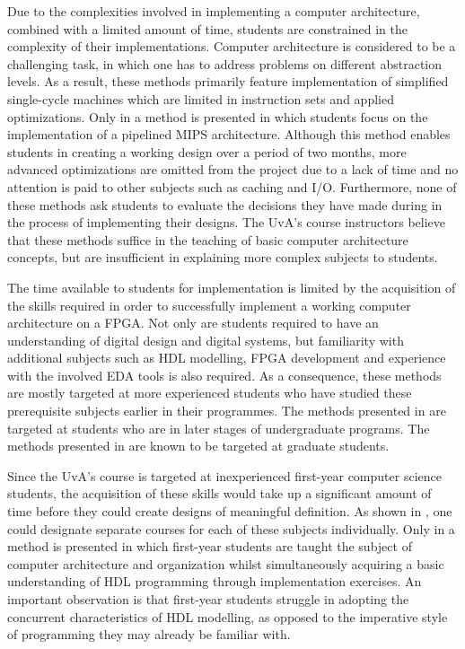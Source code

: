 \documentclass[openright]{template/uva-bachelor-thesis}
\begin{document}
Due to the complexities involved in implementing a computer architecture, combined with a limited amount of time, students are constrained in the complexity of their implementations. Computer architecture is considered to be a challenging task, in which one has to address problems on different abstraction levels. As a result, these methods primarily feature implementation of simplified single-cycle machines which are limited in instruction sets and applied optimizations. Only in \cite{lee2012pipelined} a method is presented in which students focus on the implementation of a pipelined MIPS architecture. Although this method enables students in creating a working design over a period of two months, more advanced optimizations are omitted from the project due to a lack of time and no attention is paid to other subjects such as caching and I/O. Furthermore, none of these methods ask students to evaluate the decisions they have made during in the process of implementing their designs.  The UvA's course instructors believe that these methods suffice in the teaching of basic computer architecture concepts, but are insufficient in explaining more complex subjects to students.


The time available to students for implementation is limited by the acquisition of the skills required in order to successfully implement a working computer architecture on a FPGA. Not only are students required to have an understanding of digital design and digital systems, but familiarity with additional subjects such as HDL modelling, FPGA development and experience with the involved EDA tools is also required. As a consequence, these methods are mostly targeted at more experienced students who have studied these prerequisite subjects earlier in their programmes. The methods presented in \cite{lee2012pipelined, kellett2012project} are targeted at students who are in later stages of undergraduate programs. The methods presented in \cite{nakano2008processor, jansen2014every, pereira2012basic} are known to be targeted at graduate students. 

Since the UvA's course is targeted at inexperienced first-year computer science students, the acquisition of these skills would take up a significant amount of time before they could create designs of meaningful definition. As shown in \cite[Fig. 1]{jansen2014every}, one could designate separate courses for each of these subjects individually. Only in \cite{cifredo2015computer} a method is presented in which first-year students are taught the subject of computer architecture and organization whilst simultaneously acquiring a basic understanding of HDL programming through implementation exercises. An important observation is that first-year students struggle in adopting the concurrent characteristics of HDL modelling, as opposed to the imperative style of programming they may already be familiar with. 
\end{document}
